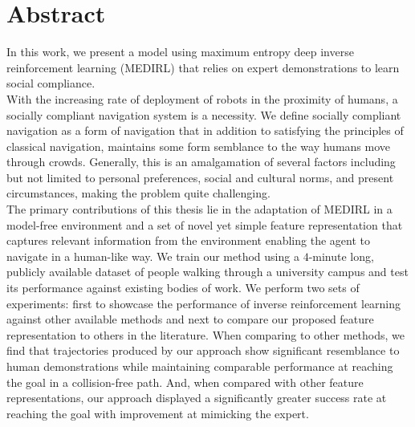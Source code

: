 \chapter*{\rm\bfseries Abstract}
In this work, we present a model using maximum entropy deep inverse reinforcement learning (MEDIRL) that relies on expert demonstrations to learn social compliance.\\
With the increasing rate of deployment of robots in the proximity of humans, a socially compliant navigation system is a necessity. We define socially compliant navigation as a form of navigation that in addition to satisfying the principles of classical navigation, maintains some form semblance to the way humans move through crowds. Generally, this is an amalgamation of several factors including but not limited to personal preferences, social and cultural norms, and present circumstances, making the problem quite challenging.\\
 The primary contributions of this thesis lie in the adaptation of MEDIRL in a model-free environment and a set of novel yet simple feature representation that captures relevant information from the environment enabling the agent to navigate in a human-like way. We train our method using a $4$-minute long, publicly available dataset of people walking through a university campus and test its performance against existing bodies of work. We perform two sets of experiments: first to showcase the performance of inverse reinforcement learning against other available methods and next to compare our proposed feature representation to others in the literature. When comparing to other methods, we find that trajectories produced by our approach show significant resemblance to human demonstrations while maintaining comparable performance at reaching the goal in a collision-free path. And, when compared with other feature representations, our approach displayed a significantly greater success rate at reaching the goal with improvement at mimicking the expert.\\



